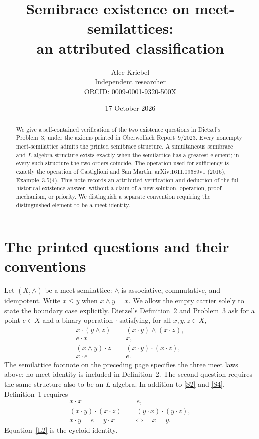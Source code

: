 \documentclass[11pt]{article}
\title{Semibrace existence on meet-semilattices:\\
an attributed classification}
\author{Alec Kriebel\\
\small Independent researcher\\
\small ORCID: \href{https://orcid.org/0009-0001-9320-500X}{0009-0001-9320-500X}}
\date{17 October 2026}
\newcommand{\meet}{\wedge}
\newcommand{\dotop}{\mathbin{\cdot}}
\begin{document}
\maketitle

\begin{abstract}
We give a self-contained verification of the two existence questions in
Dietzel's Problem~3, under the axioms printed in Oberwolfach Report~9/2023.
Every nonempty meet-semilattice admits the printed semibrace structure.
A simultaneous semibrace and \(L\)-algebra structure exists exactly when the
semilattice has a greatest element; in every such structure the two orders
coincide. The operation used for sufficiency is exactly the operation of
Castiglioni and San Mart\'in, arXiv:1611.09589v1 (2016), Example~3.5(4).
This note records an attributed verification and deduction of the full
historical existence answer, without a claim of a new solution, operation,
proof mechanism, or priority. We distinguish a separate convention requiring
the distinguished element to be a meet identity.
\end{abstract}

\section{The printed questions and their conventions}

Let \((X,\meet)\) be a meet-semilattice: \(\meet\) is associative,
commutative, and idempotent. Write \(x\leq y\) when \(x\meet y=x\).
We allow the empty carrier solely to state the boundary case explicitly.
Dietzel's Definition~2 and Problem~3 \cite[p.~545]{Dietzel} ask for a
point \(e\in X\) and a binary operation \(\dotop\) satisfying, for all
\(x,y,z\in X\),
\begin{align}
x\dotop(y\meet z)&=(x\dotop y)\meet(x\dotop z), \tag{S1}\label{S1}\\
e\dotop x&=x, \tag{S2}\label{S2}\\
(x\meet y)\dotop z&=(x\dotop y)\dotop(x\dotop z), \tag{S3}\label{S3}\\
x\dotop e&=e. \tag{S4}\label{S4}
\end{align}
The semilattice footnote on the preceding page specifies the three meet
laws above; no meet identity is included in Definition~2.
The second question requires the same structure also to be an
\(L\)-algebra. In addition to \eqref{S2} and \eqref{S4}, Definition~1
\cite[p.~544]{Dietzel} requires
\begin{align}
x\dotop x&=e, \tag{L1}\label{L1}\\
(x\dotop y)\dotop(x\dotop z)&=(y\dotop x)\dotop(y\dotop z), \tag{L2}\label{L2}\\
x\dotop y=e=y\dotop x&\quad\Longleftrightarrow\quad x=y. \tag{L3}\label{L3}
\end{align}
Equation~\eqref{L2} is the cycloid identity.
\end{document}
